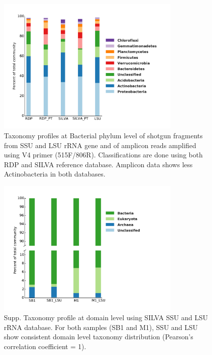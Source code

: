 \documentclass[12pt]{article}
\begin{document}
\begin{figure}[tbph!]
  \centering
  \includegraphics[width=0.8\textwidth]{figs/V4_M1_taxa}
  \caption[Taxonomy profiles at Bacterial phylum level of shotgun fragments  and of amplicon reads amplified using V4 primer]{Taxonomy profiles at Bacterial phylum level of shotgun fragments from SSU and LSU rRNA gene and of amplicon reads amplified using V4 primer (515F/806R). Classifications are done using both RDP and SILVA reference database. Amplicon data shows less Actinobacteria in both databases.}
  \label{fig:V4_M1_taxa}
\end{figure}

\begin{figure}[tbph!]
  \centering
  \includegraphics[width=0.8\textwidth]{figs/LSU_domain_taxa}
  \caption[Taxonomy profile at domain level using SILVA SSU and LSU rRNA database]{Supp. Taxonomy profile at domain level using SILVA SSU and LSU rRNA database. For both samples (SB1 and M1), SSU and LSU show consistent domain level taxonomy distribution (Pearson’s correlation coefficient = 1).}
  \label{fig:LSU_domain_taxa}
\end{figure}
\end{document}
